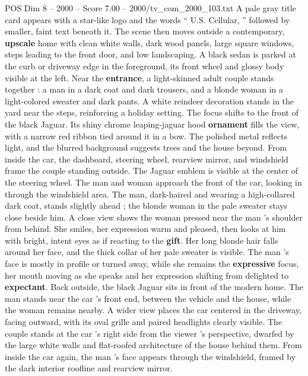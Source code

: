 \begin{textsample}{POS Dim 8 – 2000 – Score 7.00 – 2000/tv\_com\_2000\_103.txt}  \label{ex:f8_pos_014}
A pale gray title card appears with a star-like logo and the words “ U.S.
Cellular, ” followed by smaller, faint text beneath it.
The scene then moves outside a contemporary, \textbf{upscale} home with clean white walls, dark wood panels, large square windows, steps leading to the front door, and low landscaping.
A black sedan is parked at the curb or driveway edge in the foreground, its front wheel and glossy body visible at the left.
Near the \textbf{entrance}, a light-skinned adult couple stands together : a man in a dark coat and dark trousers, and a blonde woman in a light-colored sweater and dark pants.
A white reindeer decoration stands in the yard near the steps, reinforcing a holiday setting.
The focus shifts to the front of the black Jaguar.
Its shiny chrome leaping-jaguar hood \textbf{ornament} fills the view, with a narrow red ribbon tied around it in a bow.
The polished metal reflects light, and the blurred background suggests trees and the house beyond.
From inside the car, the dashboard, steering wheel, rearview mirror, and windshield frame the couple standing outside.
The Jaguar emblem is visible at the center of the steering wheel.
The man and woman approach the front of the car, looking in through the windshield area.
The man, dark-haired and wearing a high-collared dark coat, stands slightly ahead ; the blonde woman in the pale sweater stays close beside him.
A close view shows the woman pressed near the man ’s shoulder from behind.
She smiles, her expression warm and pleased, then looks at him with bright, intent eyes as if reacting to the \textbf{gift}.
Her long blonde hair falls around her face, and the thick collar of her pale sweater is visible.
The man ’s face is mostly in profile or turned away, while she remains the \textbf{expressive} focus, her mouth moving as she speaks and her expression shifting from delighted to \textbf{expectant}.
Back outside, the black Jaguar sits in front of the modern home.
The man stands near the car ’s front end, between the vehicle and the house, while the woman remains nearby.
A wider view places the car centered in the driveway, facing outward, with its oval grille and paired headlights clearly visible.
The couple stands at the car ’s right side from the viewer ’s perspective, dwarfed by the large white walls and flat-roofed architecture of the house behind them.
From inside the car again, the man ’s face appears through the windshield, framed by the dark interior roofline and rearview mirror.

\end{textsample}
